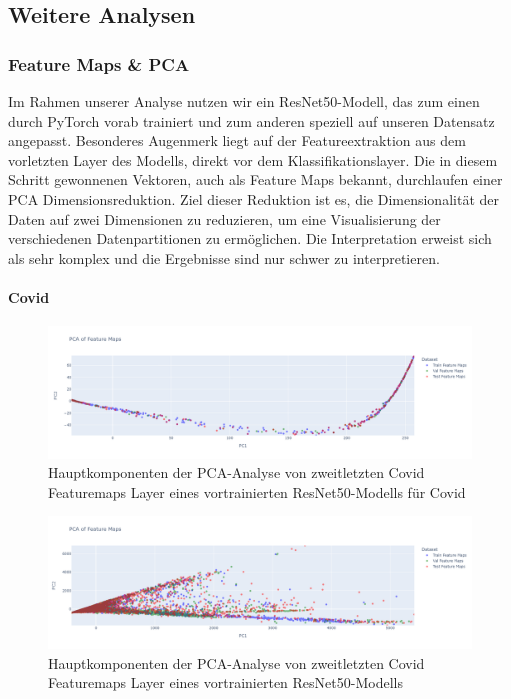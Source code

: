 \newpage

\subsection*{Weitere Analysen}

\subsubsection*{Feature Maps \& PCA} \label{chap:FeatureMaps-TestProblemEda3-mri}

Im Rahmen unserer Analyse nutzen wir ein ResNet50-Modell, das zum einen durch PyTorch vorab trainiert und zum anderen speziell auf unseren Datensatz angepasst. Besonderes Augenmerk liegt auf der Featureextraktion aus dem vorletzten Layer des Modells, direkt vor dem Klassifikationslayer. Die in diesem Schritt gewonnenen Vektoren, auch als Feature Maps bekannt, durchlaufen einer PCA Dimensionsreduktion. Ziel dieser Reduktion ist es, die Dimensionalität der Daten auf zwei Dimensionen zu reduzieren, um eine Visualisierung der verschiedenen Datenpartitionen zu ermöglichen. Die Interpretation erweist sich als sehr komplex und die Ergebnisse sind nur schwer zu interpretieren. 

\paragraph*{Covid}

\begin{figure}[H]
    \centering
    \includegraphics[width=\linewidth]{01-images/06-ending/covidx-all-feautremap-pca-ourmodel-resnet50.png}
    \caption{Hauptkomponenten der PCA-Analyse von zweitletzten Covid Featuremaps Layer eines vortrainierten ResNet50-Modells für Covid}
    \label{fig:covidx-feautremap-pca-ourmodel-resnet50}
\end{figure}

\begin{figure}[H]
    \centering
    \includegraphics[width=\linewidth]{01-images/06-ending/covidx-all-feautremap-pca-model-resnet50.png}
    \caption{Hauptkomponenten der PCA-Analyse von zweitletzten Covid Featuremaps Layer eines vortrainierten ResNet50-Modells}
    \label{fig:covidx-feautremap-pca-model-resnet50}
\end{figure}


